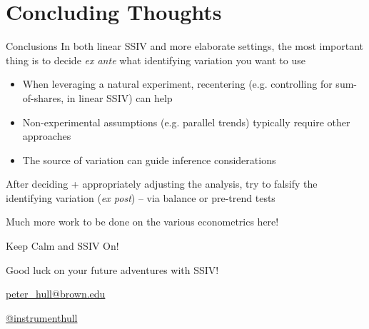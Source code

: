 \documentclass{beamer}
\begin{document}
\section{Concluding Thoughts}
\begin{frame}{Conclusions}
In both linear SSIV and more elaborate settings, the most important thing is to decide \emph{ex ante} what identifying variation you want to use\smallskip\pause
\begin{itemize}
\item When leveraging a natural experiment, recentering (e.g. controlling for sum-of-shares, in linear SSIV) can help\smallskip\pause
\item Non-experimental assumptions (e.g. parallel trends) typically require other approaches \smallskip
\item The source of variation can guide inference considerations
\end{itemize}\medskip\pause

After deciding + appropriately adjusting the analysis, try to falsify the identifying variation (\emph{ex post}) -- via balance or pre-trend tests\bigskip\pause

Much more work to be done on the various econometrics here!
\end{frame}


\begin{frame}{Keep Calm and SSIV On!}

\begin{center}
Good luck on your future adventures with SSIV!

\bigskip
\url{peter_hull@brown.edu}

\bigskip
\url{@instrumenthull}
\end{center}
\end{frame}
\end{document}
